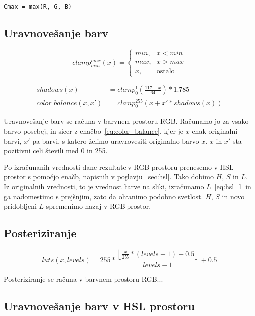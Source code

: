 \begin{lstlisting}[caption=algoritem]
Cmax = max(R, G, B)

\end{lstlisting}

\subsection{Uravnovešanje barv}

\begin{equation}
clamp_{min}^{max}(x) =
\begin{cases}
    min \text{,}& x < min \\
    max \text{,}& x > max \\
    x \text{,}& \text{ostalo}
\end{cases}
\end{equation}

\begin{align}
shadows(x) &= clamp_{0}^{1}(\frac{117 - x}{64}) * 1.785 \\
color\_balance(x, x') &= clamp_{0}^{255}(x + x' * shadows(x)) \label{eq:color_balance}
\end{align}

Uravnovešanje barv se računa v barvnem prostoru RGB. Računamo jo za vsako
barvo posebej, in sicer z enačbo~\eqref{eq:color_balance}, kjer je $x$ enak
originalni barvi, $x'$ pa barvi, s katero želimo uravnovesiti originalno barvo
$x$. $x$ in $x'$ sta pozitivni celi števili med 0 in 255.

Po izračunanih vrednosti dane rezultate v RGB prostoru prenesemo v HSL prostor
s pomočjo enačb, napisnih v poglavju~\ref{sec:hsl}. Tako dobimo $H$, $S$ in
$L$. Iz originalnih vrednosti, to je vrednost barve na sliki, izračunamo
$L$~\ref{eq:hsl_l} in ga nadomestimo s prejšnjim, zato da ohranimo podobno
svetlost. $H$, $S$ in novo pridobljeni $L$ spremenimo nazaj v RGB prostor.

\subsection{Posteriziranje}

\begin{equation}
luts(x, levels) = 255 * \frac{\left \lfloor{\frac{x}{255} * (levels - 1) + 0.5}\right \rfloor}{levels - 1} + 0.5
\end{equation}

Posteriziranje se računa v barvnem prostoru RGB...

\subsection{Uravnovešanje barv v HSL prostoru}

